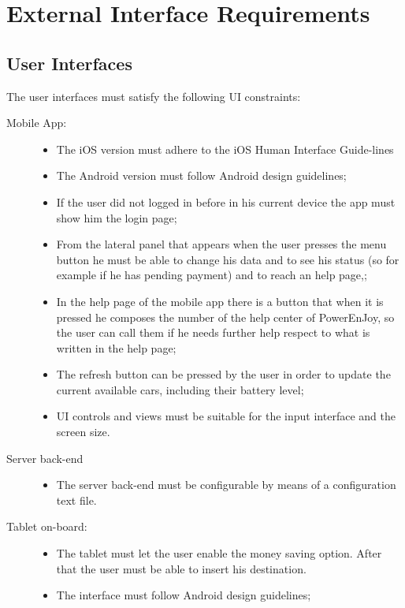 \section{External Interface Requirements}

\subsection{User Interfaces}
The user interfaces must satisfy the following UI constraints:
\begin{description}
\item[Mobile App:]
	\begin{itemize}
	\item The iOS version must adhere to the iOS Human Interface Guide-lines
	\item The Android version must follow Android design guidelines;
	\item If the user did not logged in before in his current device the app must show him the login page;
	\item From the lateral panel that appears when the user presses the menu button he must be able to change his data and to see his status (so for example if he has pending payment) and to reach an help page,;
	\item In the help page of the mobile app there is a button that when it is pressed he composes the number of the help center of PowerEnJoy, so the user can call them if he needs further help respect to what is written in the help page;
	\item The refresh button can be pressed by the user in order to update the current available cars, including their battery level;
	\item UI controls and views must be suitable for the input interface and the screen size.
	\end{itemize}
\item[Server back-end]
	\begin{itemize}
	\item The server back-end must be configurable by means of a configuration text file.
	\end{itemize}
\item[Tablet on-board:]
	\begin{itemize}
	\item The tablet must let the user enable the money saving option. After that the user must be able to insert his destination.
	\item The interface must follow Android design guidelines;

\end{itemize}
\end{description}
